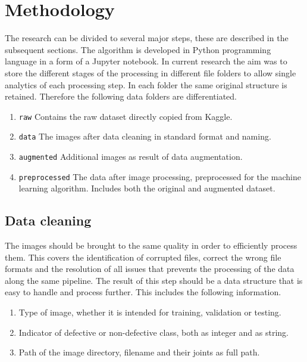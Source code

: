 \documentclass[10pt, final]{article}
\begin{document}
	\section{Methodology} \label{sec:method}
		The research can be divided to several major steps, these are described in the subsequent sections.
		The algorithm is developed in Python programming language in a form of a Jupyter notebook.
		In current research the aim was to store the different stages of the processing in different file 
		folders to allow single analytics of each processing step. 
		In each folder the same original structure is retained.
		Therefore the following data folders are differentiated.
		\begin{enumerate}
			\item \lstinline{raw} Contains the raw dataset directly copied from Kaggle.
			\item \lstinline{data} The images after data cleaning in standard format and naming.
			\item \lstinline{augmented} Additional images as result of data augmentation.
			\item \lstinline{preprocessed} The data after image processing, preprocessed for the machine learning
				algorithm. Includes both the original and augmented dataset.
		\end{enumerate}
		
		\subsection{Data cleaning}
			The images should be brought to the same quality in order to efficiently process them.
			This covers the identification of corrupted files, correct the wrong file formats 
			and the resolution of all issues that prevents the processing of the data along the same pipeline.
			The result of this step should be a data structure that is easy to handle and process further.
			This includes the following information.
			\begin{enumerate}
				\item Type of image, whether it is intended for training, validation or testing.
				\item Indicator of defective or non-defective class, both as integer and as string.
				\item Path of the image directory, filename and their joints as full path.
			\end{enumerate}
		
\end{document}
